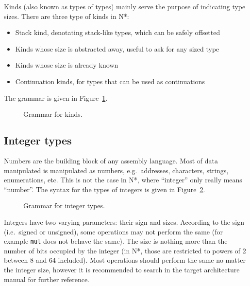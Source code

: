 Kinds (also known as types of types) mainly serve the purpose of indicating type sizes.
There are three type of kinds in N*:
\begin{itemize}
  \item Stack kind, denotating stack-like types, which can be safely offsetted
  \item Kinds whose size is abstracted away, useful to ask for any sized type
  \item Kinds whose size is already known
  \item Continuation kinds, for types that can be used as continuations
\end{itemize}
The grammar is given in Figure~\ref{fig:nstar-common-ts-kinds-syntax}.

\begin{figure}[htb]
  \centering
  \caption{Grammar for kinds.}
  \label{fig:nstar-common-ts-kinds-syntax}
\end{figure}

\subsection{Integer types}\label{subsec:nstar-common-ts-integer}

Numbers are the building block of any assembly language. Most of data manipulated is manipulated as numbers, e.g.\ addresses, characters, strings, enumerations, etc.
This is not the case in N*, where ``integer''  only really means ``number''.
The syntax for the types of integers is given in Figure~\ref{fig:nstar-common-ts-integer-syntax}.

\begin{figure}[htb]
  \centering
  \caption{Grammar for integer types.}
  \label{fig:nstar-common-ts-integer-syntax}
\end{figure}

Integers have two varying parameters: their sign and sizes.
According to the sign (i.e.\ signed or unsigned), some operations may not perform the same (for example \texttt{mul} does not behave the same).
The size is nothing more than the number of bits occupied by the integer (in N*, those are restricted to powers of 2 between $8$ and $64$ included).
Most operations should perform the same no matter the integer size, however it is recommended to search in the target architecture manual for further reference.

